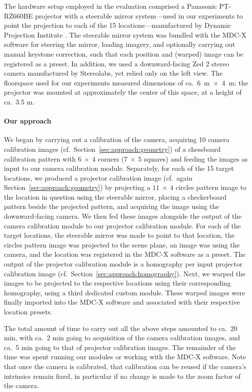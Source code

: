 \documentclass[review]{elsarticle}
\begin{document}
The hardware setup employed in the evaluation comprised a Panasonic PT-RZ660BE projector with a steerable mirror system---used in our experiments to point the projection to each of the 15 locations---manufactured by Dynamic Projection Institute \cite{rupprecht2020information}. The steerable mirror system was bundled with the MDC-X software for steering the mirror, loading imagery, and optionally carrying out manual keystone correction, such that each position and (warped) image can be registered as a preset. In addition, we used a downward-facing Zed 2 stereo camera manufactured by Stereolabs, yet relied only on the left view. The floorspace used for our experiments measured dimensions of ca.\ 6~m~$\times$~4~m; the projector was mounted at approximately the center of this space, at a height of ca.\ 3.5 m.

\paragraph{Our approach} We began by carrying out a calibration of the camera, acquiring 10 camera calibration images (cf.\ Section~\ref{sec:approach:geometry}) of a chessboard calibration pattern with $6~\times~4$ corners ($7~\times~5$ squares) and feeding the images as input to our camera calibration module. Separately, for each of the 15 target locations, we produced a projector calibration image (cf.\ again Section~\ref{sec:approach:geometry}) by projecting a $11~\times~4$ circles pattern image to the location in question using the steerable mirror, placing a checkerboard pattern beside the projected pattern, and acquiring the image using the downward-facing camera. We then fed these images alongside the output of the camera calibration module to our projector calibration module. For each of the target locations, the steerable mirror was made to point to that location, the circles pattern image was projected to the scene plane, an image was using the camera, and the location was registered in the MDC-X software as a preset. The output of the projector calibration module is a homography per input projector calibration image (cf.\ Section~\ref{sec:approach:homography}). Next, we warped the images to be projected to the respective locations using their corresponding homography, using a third dedicated custom module. These warped images were finally imported into the MDC-X software and associated with their respective location presets.

The total amount of time to carry out all the above steps amounted to ca.\ 20 min, with ca.\ 2 min going to acquisition of the camera calibration images, and ca.\ 5 min going to that of projector calibration images. The remainder of the time was spent running our modules or working with the MDC-X software. Note that once the camera is calibrated, that calibration can be reused if the camera's intrinsics remain fixed, in particular if no change is made to the zoom factor of the camera.
\end{document}
